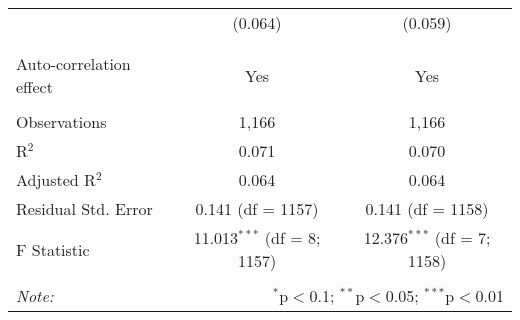 \begin{table}[!htbp]
\begin{tabular}{@{\extracolsep{5pt}}lcc}
  & (0.064) & (0.059) \\ 
  & & \\ 
\hline \\[-1.8ex] 
Auto-correlation effect & Yes & Yes \\ 
\hline \\[-1.8ex] 
Observations & 1,166 & 1,166 \\ 
R$^{2}$ & 0.071 & 0.070 \\ 
Adjusted R$^{2}$ & 0.064 & 0.064 \\ 
Residual Std. Error & 0.141 (df = 1157) & 0.141 (df = 1158) \\ 
F Statistic & 11.013$^{***}$ (df = 8; 1157) & 12.376$^{***}$ (df = 7; 1158) \\ 
\hline 
\hline \\[-1.8ex] 
\textit{Note:}  & \multicolumn{2}{r}{$^{*}$p$<$0.1; $^{**}$p$<$0.05; $^{***}$p$<$0.01} \\ 
\end{tabular} 
\end{table} 
